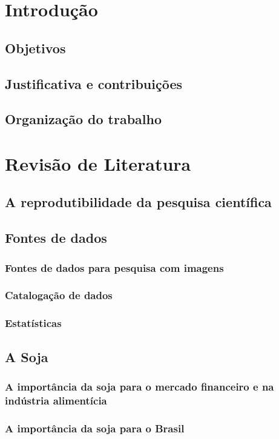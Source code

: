 \chapter{Introdução}
\section{Objetivos}
\section{Justificativa e contribuições}
\section{Organização do trabalho}

\chapter{Revisão de Literatura}
\section{A reprodutibilidade da pesquisa científica}
\section{Fontes de dados}
\subsection{Fontes de dados para pesquisa com imagens}
\subsection{Catalogação de dados}
\subsection{Estatísticas}

\section{A Soja}
\subsection{A importância da soja para o mercado financeiro e na indústria alimentícia}
\subsection{A importância da soja para o Brasil}
